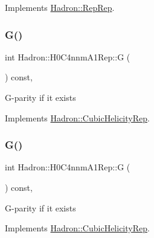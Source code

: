 Implements \mbox{\hyperlink{structHadron_1_1RepRep_a92c8802e5ed7afd7da43ccfd5b7cd92b}{Hadron\+::\+Rep\+Rep}}.

\mbox{\label{structHadron_1_1H0C4nnmA1Rep_a4b3dc2356d50c1fafd1c07098bcf019d}} 
\subsubsection{\texorpdfstring{G()}{G()}\hspace{0.1cm}{\footnotesize\ttfamily [1/3]}}
{\footnotesize\ttfamily int Hadron\+::\+H0\+C4nnm\+A1\+Rep\+::G (\begin{DoxyParamCaption}{ }\end{DoxyParamCaption}) const\hspace{0.3cm}{\ttfamily [inline]}, {\ttfamily [virtual]}}

G-\/parity if it exists 

Implements \mbox{\hyperlink{structHadron_1_1CubicHelicityRep_a50689f42be1e6170aa8cf6ad0597018b}{Hadron\+::\+Cubic\+Helicity\+Rep}}.

\mbox{\label{structHadron_1_1H0C4nnmA1Rep_a4b3dc2356d50c1fafd1c07098bcf019d}} 
\subsubsection{\texorpdfstring{G()}{G()}\hspace{0.1cm}{\footnotesize\ttfamily [2/3]}}
{\footnotesize\ttfamily int Hadron\+::\+H0\+C4nnm\+A1\+Rep\+::G (\begin{DoxyParamCaption}{ }\end{DoxyParamCaption}) const\hspace{0.3cm}{\ttfamily [inline]}, {\ttfamily [virtual]}}

G-\/parity if it exists 

Implements \mbox{\hyperlink{structHadron_1_1CubicHelicityRep_a50689f42be1e6170aa8cf6ad0597018b}{Hadron\+::\+Cubic\+Helicity\+Rep}}.

\mbox{\label{structHadron_1_1H0C4nnmA1Rep_a4b3dc2356d50c1fafd1c07098bcf019d}} 
